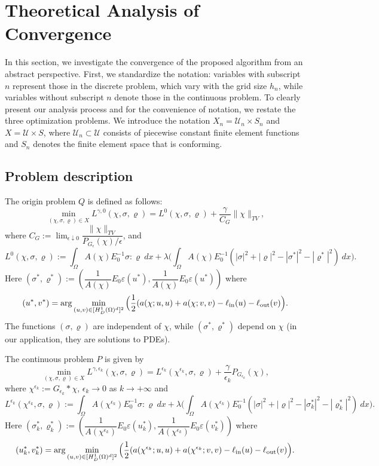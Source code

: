 \documentclass{amsart}
\begin{document}
\section{Theoretical Analysis of Convergence}\label{sec:theory}
 In this section, we investigate the convergence of the proposed algorithm from an abstract perspective. First, we standardize the notation: variables with subscript \( n \) represent those in the discrete problem, which vary with the grid size \( h_n \), while variables without subscript \( n \) denote those in the continuous problem. To clearly present our analysis process and for the convenience of notation, we restate the three optimization problems.  We introduce the notation \( X_n = \mathcal{U}_n \times S_n\) and \( X = \mathcal{U} \times S \), where \( \mathcal{U}_n \subset \mathcal{U}\) consists of piecewise constant finite element functions and \( S_n \) denotes the finite element space that is conforming. 
 
\subsection{Problem description}
The origin problem $Q$ is defined as follows:
\begin{equation}
    \min_{(\chi,\sigma,\varrho)\in X}L^{\gamma,0}(\chi,\sigma,\varrho)= L^{0}(\chi,\sigma,\varrho)+\dfrac{\gamma}{C_G} \|\chi\|_{TV},
\end{equation}
where $C_G:=\lim_{\epsilon\downarrow0}\dfrac{\|\chi\|_{TV}}{ P_{G_\epsilon}(\chi)/\epsilon}$, and
$$L^{0}(\chi,\sigma,\varrho):=\int_\Omega A(\chi)E_0^{-1}\sigma:\varrho\ dx + \lambda\Big(\int_\Omega A(\chi)E_0^{-1}(|\sigma|^2+|\varrho|^2-|\sigma^*|^2-|\varrho^*|^2)\ dx\Big).$$
Here $(\sigma^*,\varrho^*):=(\dfrac{1}{A(\chi)}E_0\varepsilon(u^*),\dfrac{1}{A(\chi)}E_0\varepsilon(u^*))$ where
$$(u^*,v^*)=\arg\min_{(u,v)\in [H_D^1(\Omega)^d]^2}\Big(\dfrac{1}{2}(a(\chi;u,u)+a(\chi;v,v)-\ell_{\rm in}(u)-\ell_{\rm out}(v)\Big).$$
The functions \( (\sigma,\varrho)\) are independent of $\chi$, while \( (\sigma^*,\varrho^*) \) depend on \( \chi \) (in our application, they are solutions to PDEs).

The continuous problem $P$ is given by
\begin{equation}
    \min_{(\chi,\sigma,\varrho)\in X}L^{\gamma,\epsilon_k}(\chi,\sigma,\varrho)=L^{\epsilon_k}(\chi^{\epsilon_k},\sigma,\varrho) +\dfrac{\gamma}{\epsilon_k} P_{G_{\epsilon_k}}(\chi),
\end{equation}
where \(\chi^{\epsilon_k} := G_{\epsilon_k} * \chi\), $\epsilon_k\rightarrow 0$ as $k\rightarrow +\infty$ and
$$L^{\epsilon_k}(\chi^{\epsilon_k},\sigma,\varrho):=\int_\Omega A(\chi^{\epsilon_k})E_0^{-1}\sigma:\varrho\ dx + \lambda\Big(\int_\Omega A(\chi^{\epsilon_k})E_0^{-1}(|\sigma|^2+|\varrho|^2-|\sigma^*_k|^2-|\varrho^*_k|^2)\ dx\Big).$$
Here $(\sigma^*_k,\varrho^*_k):=(\dfrac{1}{A(\chi^{\epsilon_k})}E_0\varepsilon(u^*_k),\dfrac{1}{A(\chi^{\epsilon_k})}E_0\varepsilon(v^*_k))$ where
$$(u^*_k,v^*_k)=\arg\min_{(u,v)\in [H_D^1(\Omega)^d]^2}\Big(\dfrac{1}{2}(a(\chi^{\epsilon_k};u,u)+a(\chi^{\epsilon_k};v,v)-\ell_{\rm in}(u)-\ell_{\rm out}(v)\Big).$$
\end{document}
